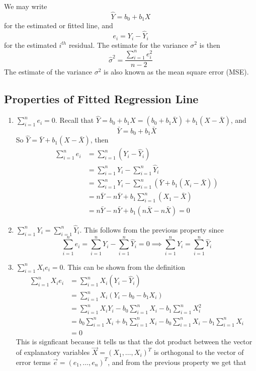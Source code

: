 \noindent
We may write 
\[\hat{Y} = b_0 + b_1X\]
for the estimated or fitted line, and 
\[e_i = Y_i - \hat{Y}_i\]
for the estimated $i^{th}$ residual. The estimate for the variance $\sigma^2$ is then 
\[\hat{\sigma}^2 = \frac{\sum_{i=1}^n e_i^2}{n-2}\]
The estimate of the variance $\sigma^2$ is also known as the mean square error (MSE). 

\subsection{Properties of Fitted Regression Line}
\begin{enumerate}[label=(\roman*)]
    \item $\sum\limits_{i=1}^n e_i = 0$. Recall that $\hat{Y} = b_0 + b_1X = (b_0 + b_1\bar{X}) + b_1(X - \bar{X})$, and 
    \[\bar{Y} = b_0 + b_1\bar{X}\]
    So $\hat{Y} = \bar{Y} + b_1(X - \bar{X})$, then
    \begin{align*}
        \sum_{i=1}^n e_i &= \sum_{i=1}^n (Y_i - \hat{Y}_i)\\
        &= \sum_{i=1}^n Y_i - \sum_{i=1}^n \hat{Y}_i\\
        &= \sum_{i=1}^n Y_i - \sum_{i=1}^n (\bar{Y} + b_1(X_i - \bar{X}))\\
        &= n\bar{Y} - n\bar{Y} + b_1\sum_{i=1}^n (X_1 - \bar{X})\\
        &= n\bar{Y} - n\bar{Y} + b_1(n\bar{X} - n\bar{X}) = 0
    \end{align*}
    \item $\sum\limits_{i=1}^n Y_i = \sum\limits_{i=1}^n \hat{Y}_i$. This follows from the previous property since 
    \[\sum_{i=1}^n e_i = \sum_{i=1}^n Y_i - \sum_{i=1}^n \hat{Y}_i = 0 \implies \sum_{i=1}^n Y_i = \sum_{i=1}^n \hat{Y}_i\]
    \item $\sum\limits_{i=1}^n X_ie_i = 0$. This can be shown from the definition
    \begin{align*}
        \sum_{i=1}^n X_ie_i &= \sum_{i=1}^n X_i(Y_i - \hat{Y}_i)\\
        &= \sum_{i=1}^n X_i(Y_i - b_0 - b_1X_i)\\
        &= \sum_{i=1}^n X_iY_i - b_0\sum_{i=1}^n X_i - b_1\sum_{i=1}^nX_i^2\\
        &= b_0 \sum_{i=1}^n X_i + b_1\sum_{i=1}^n X_i - b_0 \sum_{i=1}^n X_i - b_1\sum_{i=1}^n X_i\\
        &= 0
    \end{align*}
    This is signficant because it tells us that the dot product between the vector of explanatory variables $\vec{X} = (X_1, \ldots, X_i)^T$ is orthogonal to the vector of error terms $\vec{e} = (e_1, \ldots, e_n)^T$, and from the previous property we get that 

\end{enumerate}
